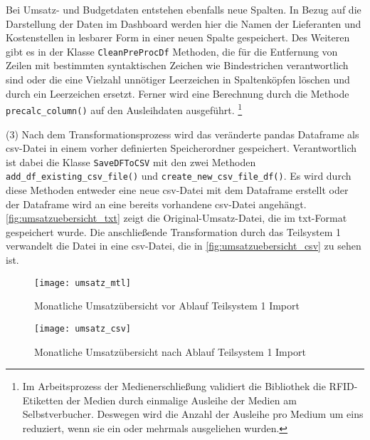     
    Bei Umsatz- und Budgetdaten entstehen ebenfalls neue Spalten. In Bezug auf die Darstellung der Daten im Dashboard werden
    hier die Namen der Lieferanten und Kostenstellen in lesbarer Form in einer neuen Spalte gespeichert. 
    Des Weiteren gibt es in der Klasse \texttt{CleanPreProcDf} Methoden, die für die Entfernung von Zeilen mit bestimmten syntaktischen Zeichen wie Bindestrichen 
    verantwortlich sind oder die eine Vielzahl unnötiger Leerzeichen in Spaltenköpfen löschen  und durch ein Leerzeichen ersetzt.
    Ferner wird eine Berechnung durch die Methode \texttt{precalc\_column()} auf den Ausleihdaten ausgeführt.
    \footnote{Im Arbeitsprozess der Medienerschließung validiert die Bibliothek die RFID-Etiketten der Medien durch einmalige Ausleihe der Medien am Selbstverbucher.
    Deswegen wird die Anzahl der Ausleihe pro Medium um eins reduziert, wenn sie ein oder mehrmals ausgeliehen wurden.}
     
    (3) Nach dem Transformationsprozess wird das veränderte pandas Dataframe als csv-Datei in einem vorher definierten Speicherordner gespeichert. 
    Verantwortlich ist dabei die Klasse \texttt{SaveDFToCSV} mit den zwei Methoden \texttt{add\_df\_existing\_csv\_file()} und 
    \texttt{create\_new\_csv\_file\_df()}. 
    Es wird durch diese Methoden entweder eine neue csv-Datei mit dem Dataframe erstellt oder der Dataframe wird an eine bereits vorhandene csv-Datei angehängt.
    \autoref{fig:umsatzuebersicht_txt} zeigt die Original-Umsatz-Datei, die im txt-Format gespeichert wurde. Die anschließende Transformation durch das Teilsystem 1
    verwandelt die Datei in eine csv-Datei, die in \autoref{fig:umsatzuebersicht_csv} zu sehen ist.

    \begin{figure}[H]
        \centering
            \texttt{[image: umsatz\_mtl]}
            \caption{Monatliche Umsatzübersicht vor Ablauf Teilsystem 1 Import}
            \label{fig:umsatzuebersicht_txt}
    \end{figure}


    \begin{figure}[H]
        \centering
            \texttt{[image: umsatz\_csv]}
            \caption{Monatliche Umsatzübersicht nach Ablauf Teilsystem 1 Import}
            \label{fig:umsatzuebersicht_csv}
    \end{figure}

